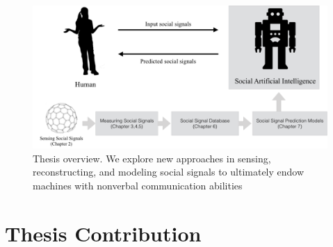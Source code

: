 \begin{figure}[t]
	\centering
	\includegraphics[trim=0 0 0 0, clip=true, width=\textwidth]{figures/intro_framework}
	\caption{Thesis overview. We explore new approaches in sensing, reconstructing, and modeling social signals to ultimately endow machines with nonverbal communication abilities}	
	\label{fig:thesis_overview}
\end{figure}



\section{Thesis Contribution}

